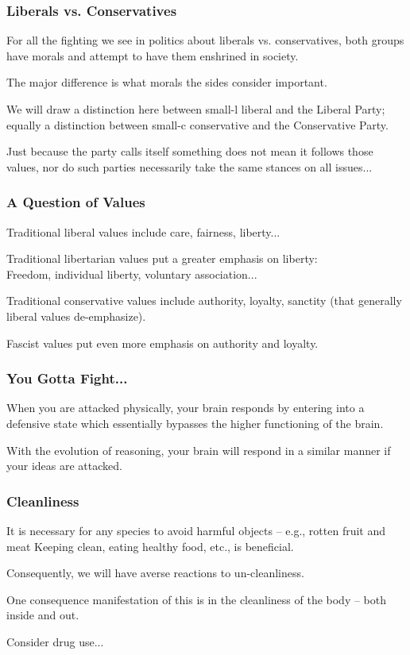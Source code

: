 \begin{frame}
\frametitle{Liberals vs. Conservatives}

For all the fighting we see in politics about liberals vs. conservatives, both groups have morals and attempt to have them enshrined in society.

The major difference is what morals the sides consider important. 

We will draw a distinction here between small-l liberal and the Liberal Party; equally a distinction between small-c conservative and the Conservative Party.

Just because the party calls itself something does not mean it follows those values, nor do such parties necessarily take the same stances on all issues...

\end{frame}



\begin{frame}
\frametitle{A Question of Values}

Traditional liberal values include care, fairness, liberty...

Traditional libertarian values put a greater emphasis on liberty:\\
\quad Freedom, individual liberty, voluntary association...

Traditional conservative values include authority, loyalty, sanctity (that generally liberal values de-emphasize).

Fascist values put even more emphasis on authority and loyalty.

\end{frame}



\begin{frame}
\frametitle{You Gotta Fight...}

When you are attacked physically, your brain responds by entering into a defensive state which essentially bypasses the higher functioning of the brain.


With the evolution of reasoning, your brain will respond in a similar manner if your ideas are attacked.

\end{frame}



\begin{frame}
\frametitle{Cleanliness}

It is necessary for any species to avoid harmful objects -- e.g., rotten fruit and meat
Keeping clean, eating healthy food, etc., is beneficial. 

Consequently, we will have averse reactions to un-cleanliness.

One consequence manifestation of this is in the cleanliness of the body -- both inside and out.

Consider drug use...

\end{frame}



